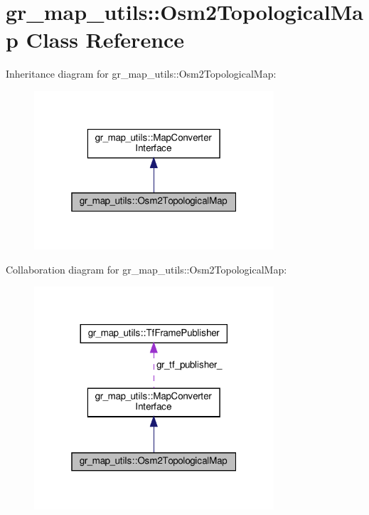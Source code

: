 \hypertarget{classgr__map__utils_1_1Osm2TopologicalMap}{}\section{gr\+\_\+map\+\_\+utils\+:\+:Osm2\+Topological\+Map Class Reference}
\label{classgr__map__utils_1_1Osm2TopologicalMap}


Inheritance diagram for gr\+\_\+map\+\_\+utils\+:\+:Osm2\+Topological\+Map\+:
\nopagebreak
\begin{figure}[H]
\begin{center}
\leavevmode
\includegraphics[width=253pt]{classgr__map__utils_1_1Osm2TopologicalMap__inherit__graph}
\end{center}
\end{figure}


Collaboration diagram for gr\+\_\+map\+\_\+utils\+:\+:Osm2\+Topological\+Map\+:
\nopagebreak
\begin{figure}[H]
\begin{center}
\leavevmode
\includegraphics[width=253pt]{classgr__map__utils_1_1Osm2TopologicalMap__coll__graph}
\end{center}
\end{figure}
